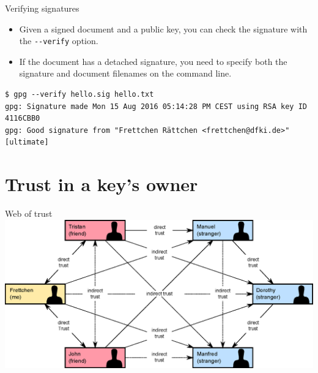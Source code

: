 \documentclass[%
mode=present,%
paper=smartboard,
size=20pt,
]{powerdot}
\newcommand{\clopt}[1]{\texttt{{-}#1}}
\begin{document}
\begin{slide}[method=direct]{Verifying signatures}
  \begin{itemize}
  \item Given a signed document and a public key, you can check the
    signature with the \clopt{-verify} option.
  \item If the document has a detached signature, you need to specify
    both the signature and document filenames on the command line.
  \end{itemize}
\begin{verbatim}
$ gpg --verify hello.sig hello.txt
gpg: Signature made Mon 15 Aug 2016 05:14:28 PM CEST using RSA key ID 4116CBB0
gpg: Good signature from "Frettchen Rättchen <frettchen@dfki.de>" [ultimate]
\end{verbatim}
\end{slide}

\section{Trust in a key's owner}

\begin{slide}[toc=]{Web of trust}
\centering\includegraphics[width=\linewidth]{images/Web_of_Trust.eps}
\end{slide}
\end{document}
